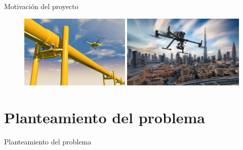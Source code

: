 \documentclass[
  24pt, %
  aspectratio=169, %
]{beamer}
\begin{document}
\begin{frame}{Motivación del proyecto}
\begin{figure}[ht!]
\begin{minipage}{0.48\textwidth}
            \centering
            \includegraphics[width=\linewidth,height=3.5cm]{pipe_drone.jpg} %
        \end{minipage}\hfill
        \begin{minipage}{0.48\textwidth}
            \centering
            \includegraphics[width=\linewidth,height=3.5cm]{drone_city.jpg} %
        \end{minipage}
    \end{figure}
\end{frame}

\section{Planteamiento del problema}
\begin{frame}{Planteamiento del problema}

  
  
\end{frame}
\end{document}
